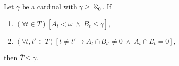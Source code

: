 Let $\gamma$ be a cardinal with $\gamma \geq \aleph_0$. If
\begin{enumerate}
\item $(\forall t \in T)[\bar{A}_t < \omega \;\wedge\; \bar{B}_t \leq \gamma]$,
\item $(\forall t, t' \in T)[t \neq t' \rightarrow A_t \cap B_{t'} \neq 0 \;\wedge\; A_t \cap B_t = 0]$,
\end{enumerate}
then $\bar{T} \leq \gamma$.
